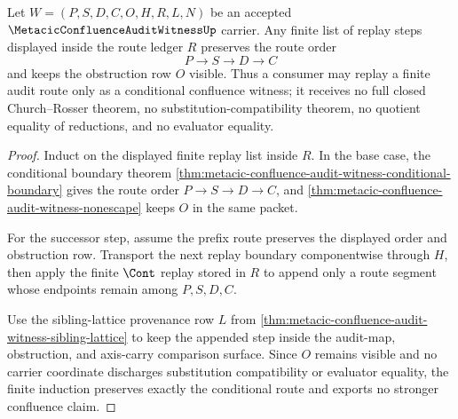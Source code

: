 \begin{theorem}
\label{thm:metacic-confluence-audit-witness-finite-route-induction}
Let $W=(P,S,D,C,O,H,R,L,N)$ be an accepted $\MetacicConfluenceAuditWitnessUp$ carrier. Any finite list of replay steps displayed inside the route ledger $R$ preserves the route order
$$
P \longrightarrow S \longrightarrow D \longrightarrow C
$$
and keeps the obstruction row $O$ visible. Thus a consumer may replay a finite audit route only as a conditional confluence witness; it receives no full closed Church--Rosser theorem, no substitution-compatibility theorem, no quotient equality of reductions, and no evaluator equality.
\end{theorem}
\begin{proof}
Induct on the displayed finite replay list inside $R$. In the base case, the conditional boundary theorem \autoref{thm:metacic-confluence-audit-witness-conditional-boundary} gives the route order $P \to S \to D \to C$, and \autoref{thm:metacic-confluence-audit-witness-nonescape} keeps $O$ in the same packet.

For the successor step, assume the prefix route preserves the displayed order and obstruction row. Transport the next replay boundary componentwise through $H$, then apply the finite $\Cont$ replay stored in $R$ to append only a route segment whose endpoints remain among $P,S,D,C$.

Use the sibling-lattice provenance row $L$ from \autoref{thm:metacic-confluence-audit-witness-sibling-lattice} to keep the appended step inside the audit-map, obstruction, and axis-carry comparison surface. Since $O$ remains visible and no carrier coordinate discharges substitution compatibility or evaluator equality, the finite induction preserves exactly the conditional route and exports no stronger confluence claim.
\end{proof}

